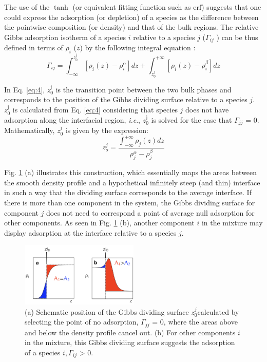 \documentclass[9pt,bestpractices]{livecoms}
\begin{document}
The use of the $\tanh$ (or equivalent fitting function such as $\mathrm{erf}$) suggests
that one could express the adsorption (or depletion) of a species as the
difference between the pointwise composition (or density) and that of the bulk
regions. The relative Gibbs adsorption isotherm of a species $i$
relative to a species $j$ (${\Gamma}_{ij}$ ) can be thus defined in
terms of ${\rho}_{i}$ ($z$) by the following integral
equation \citep{rowlinson1982}:
\begin{equation}
\varGamma_{ij}=\int_{-\infty}^{z_{0}^{j}}\left[\rho_{i}\left(z\right)-\rho{}_{i}^{\alpha}\right]dz+\int_{z_{0}^{j}}^{+\infty}\left[\rho_{i}\left(z\right)-\rho{}_{i}^{\beta}\right]dz
 \label{eq:4}
\end{equation}

In Eq. \ref{eq:4}, $z_{0}^{\mathrm{j}}$ is the transition point between the two bulk
phases and corresponds to the position of the Gibbs dividing surface relative
to a species $j$. $z_{0}^{\mathrm{j}}$ is calculated from Eq. \ref{eq:4}
considering that species $j$ does not have adsorption along the
interfacial region, \textit{i.e}., $z_{0}^{\mathrm{j}}$ is solved for the
case that ${\Gamma}_{jj}$ = 0. Mathematically, $z_{0}^{\mathrm{j}}$ is
given by the expression:
\begin{equation}
z_{o}^{j}=\frac{\int_{-\infty}^{+\infty}\rho_{j}\left(z\right)dz}{\rho_{j}^{\alpha}-\rho_{j}^{\beta}}
\end{equation}

Fig. \ref{fig:4} (a) illustrates this construction, which essentially maps the areas
between the smooth density profile and a hypothetical infinitely steep (and
thin) interface in such a way that the dividing surface corresponds to the
average interface. If there is more than one component in the system, the
Gibbs dividing surface for component $j$ does not need to correspond
a point of average null adsorption for other components. As seen in Fig. \ref{fig:4} (b),
another component $i$ in the mixture may display adsorption at the
interface relative to a species $j.$

\begin{figure}
\includegraphics[width=0.5\textwidth]{gfx/image11.png}
\caption{(a) Schematic position of the Gibbs dividing surface $z^{j}_{0 }$calculated by selecting the point of no adsorption, ${\Gamma}_{jj}$ = 0, where the areas above and below the density profile cancel out. (b) For other components $i$  in the mixture, this Gibbs dividing surface suggests the adsorption of a species $i,{\Gamma}_{ij}$ {\textgreater} 0.}
\label{fig:4}
\end{figure}
\end{document}
